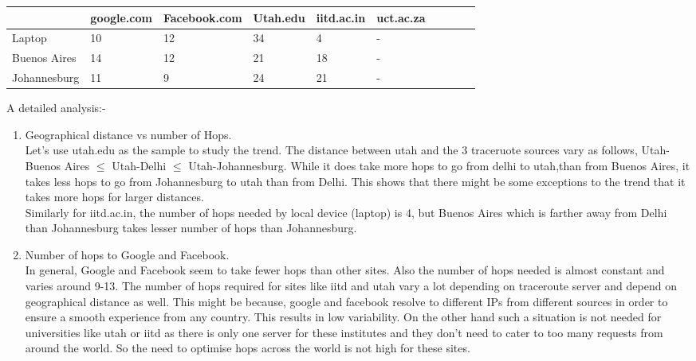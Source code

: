 \documentclass{article}
\begin{document}
\begin{table}[!ht]
    \centering
    \begin{tabular}{|l|l|l|l|l|l|l|l|l|l|}
    \hline
        ~ & google.com & Facebook.com & Utah.edu & iitd.ac.in & uct.ac.za  \\ \hline
        Laptop & 10 & 12 & 34 & 4 & - \\ \hline
        Buenos Aires & 14 & 12 & 21 & 18 & - \\ \hline
        Johannesburg & 11 & 9 & 24 & 21 & -  \\ \hline
    \end{tabular}
\end{table}

A detailed analysis:-

\begin{enumerate} [1.]
\item Geographical distance vs number of Hops.\\
Let's use utah.edu as the sample to study the trend.
The distance between utah and the 3 traceruote sources vary as follows, Utah-Buenos Aires $\leq$ Utah-Delhi $\leq$ Utah-Johannesburg. 
While it does take more hops to go from delhi to utah,than from Buenos Aires, it takes less hops to go from Johannesburg
to utah than from Delhi. This shows that there might be some exceptions to the trend that it takes more hops for larger distances.\\
Similarly for iitd.ac.in, the number of hops needed by local device (laptop) is 4, but Buenos Aires which is farther away from Delhi 
than Johannesburg takes lesser number of hops than Johannesburg.
\item Number of hops to Google and Facebook.\\
In general, Google and Facebook seem to take fewer hops than other sites. Also the number of hops needed is almost constant and varies
around 9-13. 
The number of hops required for sites like iitd and utah vary a lot depending on traceroute server and depend on geographical distance
as well.
This might be because, google and facebook resolve to different IPs from different sources in order to ensure a smooth experience from
any country. This results in low variability. On the other hand such a situation is not needed for universities like utah or iitd as 
there is only one server for these institutes and they don't need to cater to too many requests from around the world. So the need 
to optimise hops across the world is not high for these sites.
\end{enumerate}
\end{document}
